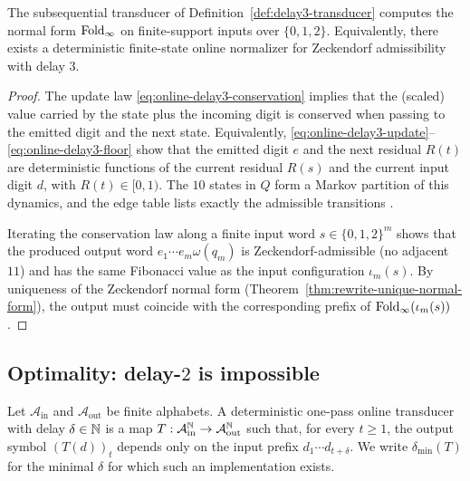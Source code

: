 \begin{theorem}\label{thm:online-delay-3}
The subsequential transducer of Definition~\ref{def:delay3-transducer} computes the normal form $\mathrm{Fold}_\infty$ on finite-support inputs over $\{0,1,2\}$.
Equivalently, there exists a deterministic finite-state online normalizer for Zeckendorf admissibility with delay $3$.
\end{theorem}
\begin{proof}
The update law \eqref{eq:online-delay3-conservation} implies that the (scaled) value carried by the state plus the incoming digit is conserved when passing to the emitted digit and the next state.
Equivalently, \eqref{eq:online-delay3-update}--\eqref{eq:online-delay3-floor} show that the emitted digit $e$ and the next residual $R(t)$ are deterministic functions of the current residual $R(s)$ and the current input digit $d$, with $R(t)\in[0,1)$.
The $10$ states in $Q$ form a Markov partition of this dynamics, and the edge table lists exactly the admissible transitions \cite{Frougny1999OnlineAddition}.
\par
Iterating the conservation law along a finite input word $s\in\{0,1,2\}^m$ shows that the produced output word $e_1\cdots e_m\omega(q_m)$ is Zeckendorf-admissible (no adjacent $11$) and has the same Fibonacci value as the input configuration $\iota_m(s)$.
By uniqueness of the Zeckendorf normal form (Theorem~\ref{thm:rewrite-unique-normal-form}), the output must coincide with the corresponding prefix of $\mathrm{Fold}_\infty(\iota_m(s))$.
\end{proof}

\subsection{Optimality: delay-$2$ is impossible}\label{app:online-delay-optimality}

\begin{definition}\label{def:online-delay}
Let $\mathcal{A}_{\mathrm{in}}$ and $\mathcal{A}_{\mathrm{out}}$ be finite alphabets.
A deterministic one-pass online transducer with delay $\delta\in\mathbb{N}$ is a map
\(
T:\mathcal{A}_{\mathrm{in}}^{\mathbb{N}}\to\mathcal{A}_{\mathrm{out}}^{\mathbb{N}}
\)
such that, for every $t\ge 1$, the output symbol $(T(d))_t$ depends only on the input prefix
\(
d_1\cdots d_{t+\delta}.
\)
We write $\delta_{\min}(T)$ for the minimal $\delta$ for which such an implementation exists.
\end{definition}

